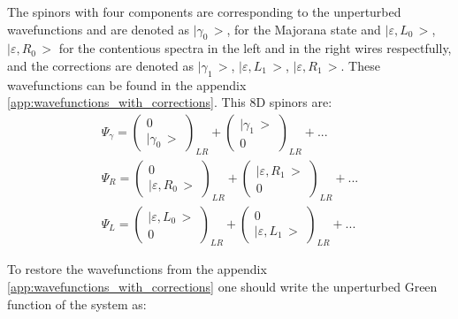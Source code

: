  The spinors with four components are corresponding to the unperturbed wavefunctions and are denoted as $ \big|\gamma_{0}\,\big> $,  for the Majorana state and $ \big|\varepsilon,L_{0}\,\big> $, $ \big|\varepsilon,R_{0}\,\big> $ for the contentious spectra in the left and in the right wires respectfully, and the corrections are denoted as $ \big|\gamma_{1}\,\big> $, $ \big|\varepsilon,L_{1}\,\big> $, $ \big|\varepsilon,R_{1}\,\big> $. These wavefunctions can be found in the appendix \ref{app:wavefunctions_with_corrections}.  This 8D spinors are:
\begin{gather}
	\Psi_{\gamma}=\begin{pmatrix}0\\
	\big|\gamma_{0}\,\big>
	\end{pmatrix}_{LR}+\begin{pmatrix}\big|\gamma_{1}\,\big>\\
	0
	\end{pmatrix}_{LR}+...\\\Psi_{R}=\begin{pmatrix}0\\
	\big|\varepsilon,R_{0}\,\big>
	\end{pmatrix}_{LR}+\begin{pmatrix}\big|\varepsilon,R_{1}\,\big>\\
	0
	\end{pmatrix}_{LR}+...\\\Psi_{L}=\begin{pmatrix}\big|\varepsilon,L_{0}\,\big>\\
	0
	\end{pmatrix}_{LR}+\begin{pmatrix}0\\
	\big|\varepsilon,L_{1}\,\big>
	\end{pmatrix}_{LR}+...
\end{gather}

To restore the wavefunctions from the appendix \ref{app:wavefunctions_with_corrections} one should write the unperturbed Green function of the system as:

